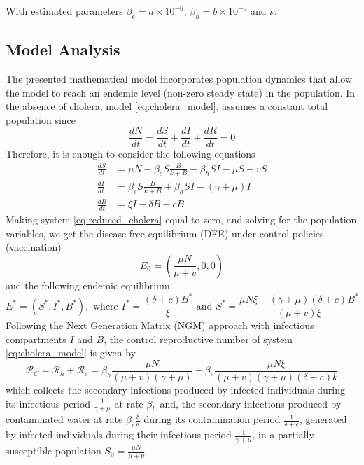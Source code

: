 \documentclass{book}\usepackage[]{graphicx}\usepackage[]{color}
\begin{document}
With estimated parameters $\beta_e=a\times 10^{-6}$, $\beta_h=b\times 10^{-9}$ and $\nu$.
%
\subsection*{Model Analysis}
The presented mathematical model incorporates population dynamics that allow the model to reach an endemic level (non-zero steady state) in the population.
In the absence of cholera, model \eqref{eq:cholera_model}, assumes a constant total population since
$$
\frac{d N}{d t}=\frac{d S}{d t}+\frac{d I}{d t}+\frac{d R}{d t}=0
$$
Therefore, it is enough to consider the following equations
\begin{equation} \label{eq:reduced_cholera}
\begin{aligned}
\frac{d S}{d t} &=\mu N-\beta_{e} S \frac{B}{k+B}-\beta_{h} S I-\mu S-v S \\
\frac{d I}{d t} &=\beta_{e} S \frac{B}{k+B}+\beta_{h} S I-(\gamma+\mu) I \\
\frac{d B}{d t} &=\xi I-\delta B-c B
\end{aligned}
\end{equation}
%
Making system \eqref{eq:reduced_cholera} equal to zero, and solving for the population variables, we get the disease-free equilibrium (DFE) under control policies (vaccination)
\begin{equation}
E_{0}=\left(\frac{\mu N}{\mu+v}, 0,0\right)
\end{equation}
and the following endemic equilibrium
$$
E^{*}=\left(S^{*}, I^{*}, B^{*}\right), \text { where } I^{*}=\frac{(\delta+c) B^{*}}{\xi} \text { and } S^{*}=\frac{\mu N \xi-(\gamma+\mu)(\delta+c) B^{*}}{(\mu+v) \xi}
$$
Following the Next Generation Matrix (NGM) approach with infectious compartments $I$ and $B$, the control reproductive number of system \eqref{eq:cholera_model} is given by
\begin{equation}
\mathcal{R}_C=\mathcal{R}_h+\mathcal{R}_e=\beta_{h} \frac{\mu N}{(\mu+v)(\gamma+\mu)}+\beta_{e} \frac{\mu N \xi}{(\mu+v)(\gamma+\mu)(\delta+c) k}
\end{equation}
which collects the secondary infections produced by infected individuals during its infectious period $\frac{1}{\gamma+\mu}$ at rate $\beta_h$ and, the secondary infections produced by contaminated water at rate $\beta_e \frac{\xi}{\kappa}$ during its contamination period $\frac{1}{\delta+c}$, generated by infected individuals during their infectious period $\frac{1}{\gamma+\mu}$, in a partially susceptible population $S_0=\frac{\mu N}{\mu+\nu}$.
\end{document}
